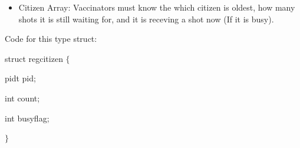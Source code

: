 \documentclass[12pt]{report}
\renewcommand{\_}{\kern-1.5pt\textunderscore\kern-1.5pt}
\begin{document}
\vspace{\baselineskip}
\begin{itemize}
	\item Citizen Array: Vaccinators must know the which citizen is oldest, how many shots it is still waiting for, and it is receving a shot now (If it is busy).
\end{itemize}

\vspace{\baselineskip}

\vspace{\baselineskip}

\vspace{\baselineskip}

\vspace{\baselineskip}
\begin{adjustwidth}{0.5in}{0.0in}
\begin{justify}
Code for this type struct:
\end{justify}
\end{adjustwidth}

\begin{adjustwidth}{0.5in}{0.0in}
\begin{justify}
\tab struct reg\_citizen $ \{ $ 
\end{justify}
\end{adjustwidth}

\begin{adjustwidth}{0.5in}{0.0in}
\begin{justify}
\tab \tab pid\_t pid;
\end{justify}
\end{adjustwidth}

\begin{adjustwidth}{0.5in}{0.0in}
\begin{justify}
\tab \tab int count;
\end{justify}
\end{adjustwidth}

\begin{adjustwidth}{0.5in}{0.0in}
\begin{justify}
\tab \tab int busy\_flag;
\end{justify}
\end{adjustwidth}

\begin{adjustwidth}{0.5in}{0.0in}
\begin{justify}
$ \} $ 
\end{justify}
\end{adjustwidth}
\end{document}
